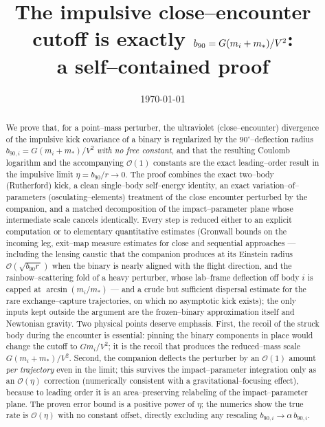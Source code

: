 \documentclass[11pt]{article}
\title{The impulsive close--encounter cutoff is exactly $\bnt=G(m_i+m_*)/V^2$:\\
a self--contained proof}
\author{}
\date{\today}
\newcommand{\bnt}{b_{90}}
\newcommand{\order}[1]{\mathcal O\!\left(#1\right)}
\begin{document}
\maketitle

\begin{abstract}
We prove that, for a point--mass perturber, the ultraviolet (close--encounter) divergence of the
impulsive kick covariance of a binary is regularized by the $90^\circ$--deflection radius
$b_{90,i}=G(m_i+m_*)/V^2$ \emph{with no free constant}, and that the resulting Coulomb logarithm and
the accompanying $\mathcal O(1)$ constants are the exact leading--order result in the impulsive limit
$\eta=\bnt/r\to0$. The proof combines the exact two--body (Rutherford) kick, a clean single--body
self--energy identity, an exact variation--of--parameters (osculating--elements) treatment of the
close encounter perturbed by the companion, and a matched decomposition of the impact--parameter
plane whose intermediate scale cancels identically. Every step is reduced either to an explicit
computation or to elementary quantitative estimates (Gronwall bounds on the incoming leg,
exit--map measure estimates for close and sequential approaches --- including the lensing caustic
that the companion produces at its Einstein radius $\order{\sqrt{\bnt r\,}}$ when
the binary is nearly aligned with the flight direction, and the rainbow--scattering fold of a
heavy perturber, whose lab--frame deflection off body $i$ is capped at $\arcsin(m_i/m_*)$ --- and
a crude but sufficient dispersal
estimate for the rare exchange--capture trajectories, on which no asymptotic kick exists); the only
inputs kept outside the argument are the frozen--binary approximation itself and Newtonian gravity.
Two physical points deserve emphasis. First, the recoil of the struck body during the encounter is
essential: pinning the binary components in place would change the cutoff to $Gm_i/V^2$; it is the
recoil that produces the reduced--mass scale $G(m_i+m_*)/V^2$. Second, the companion deflects the
perturber by an $\mathcal O(1)$ amount \emph{per trajectory} even in the limit; this survives the
impact--parameter integration only as an $\mathcal O(\eta)$ correction (numerically consistent with a
gravitational--focusing effect), because to leading order it is an area--preserving relabeling of the
impact--parameter plane. The proven error bound is a positive power of $\eta$; the numerics show the
true rate is $\mathcal O(\eta)$ with no constant offset, directly excluding any rescaling
$b_{90,i}\to\alpha\,b_{90,i}$.
\end{abstract}
\end{document}
